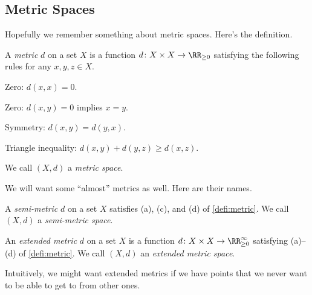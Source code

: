 \documentclass[../notes.tex]{subfiles}
\begin{document}
\subsection{Metric Spaces}
Hopefully we remember something about metric spaces. Here's the definition.
\begin{definition}[Metric] \label{defi:metric}
	A \textit{metric} $d$ on a set $X$ is a function $d\colon X\times X\to\RR_{\ge0}$ satisfying the following rules for any $x,y,z\in X$.
	\begin{listalph}
		\item Zero: $d(x,x)=0$.
		\item Zero: $d(x,y)=0$ implies $x=y$.
		\item Symmetry: $d(x,y)=d(y,x)$.
		\item Triangle inequality: $d(x,y)+d(y,z)\ge d(x,z)$.
	\end{listalph}
	We call $(X,d)$ a \textit{metric space}.
\end{definition}
We will want some ``almost'' metrics as well. Here are their names.
\begin{defihelper} 
	A \textit{semi-metric} $d$ on a set $X$ satisfies (a), (c), and (d) of \autoref{defi:metric}. We call $(X,d)$ a \textit{semi-metric space}.
\end{defihelper}
\begin{defihelper} 
	An \textit{extended metric} $d$ on a set $X$ is a function $d\colon X\times X\to\RR_{\ge0}^\infty$ satisfying (a)--(d) of \autoref{defi:metric}. We call $(X,d)$ an \textit{extended metric space}.
\end{defihelper}
Intuitively, we might want extended metrics if we have points that we never want to be able to get to from other ones.
\end{document}
